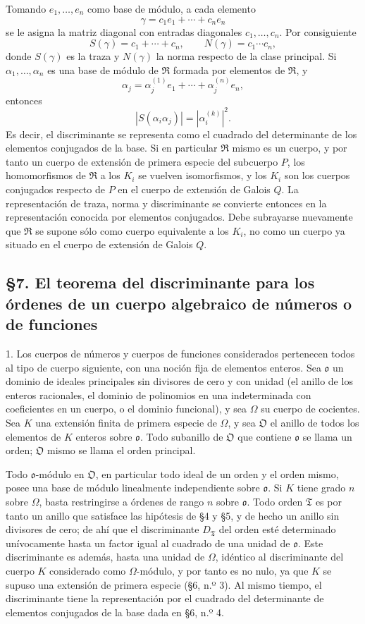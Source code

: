 \documentclass[11pt]{article}
\providecommand{\mR}{\mathfrak{R}}
\providecommand{\mT}{\mathfrak{T}}
\providecommand{\mO}{\mathfrak{O}}
\providecommand{\mo}{\mathfrak{o}}
\begin{document}
Tomando $e_1,\ldots,e_n$ como base de módulo, a cada elemento
\[
        \gamma=c_1e_1+\cdots+c_ne_n
\]
se le asigna la matriz diagonal con entradas diagonales $c_1,\ldots,c_n$. Por consiguiente
\[
        S(\gamma)=c_1+\cdots+c_n,
        \qquad
        N(\gamma)=c_1\cdots c_n,
\]
donde $S(\gamma)$ es la traza y $N(\gamma)$ la norma respecto de la clase principal. Si $\alpha_1,\ldots,\alpha_n$ es una base de módulo de $\mR$ formada por elementos de $\mR$, y
\[
        \alpha_j=\alpha_j^{(1)}e_1+\cdots+\alpha_j^{(n)}e_n,
\]
entonces
\[
        |S(\alpha_i\alpha_j)|=
        \left|\alpha_i^{(k)}\right|^2.
\]
Es decir, el discriminante se representa como el cuadrado del determinante de los elementos conjugados de la base. Si en particular $\mR$ mismo es un cuerpo, y por tanto un cuerpo de extensión de primera especie del subcuerpo $P$, los homomorfismos de $\mR$ a los $K_i$ se vuelven isomorfismos, y los $K_i$ son los cuerpos conjugados respecto de $P$ en el cuerpo de extensión de Galois $Q$. La representación de traza, norma y discriminante se convierte entonces en la representación conocida por elementos conjugados. Debe subrayarse nuevamente que $\mR$ se supone sólo como cuerpo equivalente a los $K_i$, no como un cuerpo ya situado en el cuerpo de extensión de Galois $Q$.

\subsection*{\S 7. El teorema del discriminante para los órdenes de un cuerpo algebraico de números o de funciones}

1. Los cuerpos de números y cuerpos de funciones considerados pertenecen todos al tipo de cuerpo siguiente, con una noción fija de elementos enteros. Sea $\mo$ un dominio de ideales principales sin divisores de cero y con unidad (el anillo de los enteros racionales, el dominio de polinomios en una indeterminada con coeficientes en un cuerpo, o el dominio funcional), y sea $\Omega$ su cuerpo de cocientes. Sea $K$ una extensión finita de primera especie de $\Omega$, y sea $\mO$ el anillo de todos los elementos de $K$ enteros sobre $\mo$. Todo subanillo de $\mO$ que contiene $\mo$ se llama un orden; $\mO$ mismo se llama el orden principal.

Todo $\mo$-módulo en $\mO$, en particular todo ideal de un orden y el orden mismo, posee una base de módulo linealmente independiente sobre $\mo$. Si $K$ tiene grado $n$ sobre $\Omega$, basta restringirse a órdenes de rango $n$ sobre $\mo$. Todo orden $\mT$ es por tanto un anillo que satisface las hipótesis de \S 4 y \S 5, y de hecho un anillo sin divisores de cero; de ahí que el discriminante $D_\mT$ del orden esté determinado unívocamente hasta un factor igual al cuadrado de una unidad de $\mo$. Este discriminante es además, hasta una unidad de $\Omega$, idéntico al discriminante del cuerpo $K$ considerado como $\Omega$-módulo, y por tanto es no nulo, ya que $K$ se supuso una extensión de primera especie (\S 6, n.º 3). Al mismo tiempo, el discriminante tiene la representación por el cuadrado del determinante de elementos conjugados de la base dada en \S 6, n.º 4.
\end{document}
